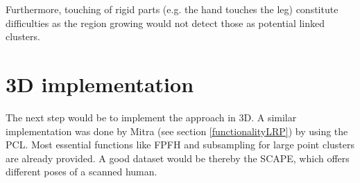 Furthermore, touching of rigid parts (e.g. the hand touches the leg) constitute difficulties as the region growing would not detect those as potential linked clusters.


\section{3D implementation}

The next step would be to implement the approach in 3D. A similar implementation was done by Mitra \cite{Mitra07} (see section \ref{functionalityLRP}) by using the PCL. Most essential functions like FPFH and subsampling for large point clusters are already provided. A good dataset would be thereby the SCAPE, which offers different poses of a scanned human. 








